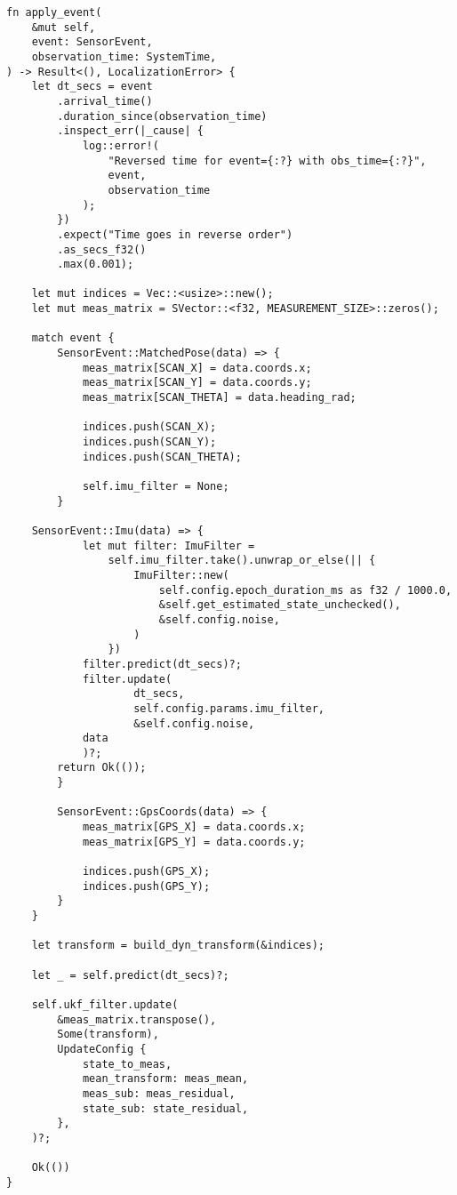 \begin{lstlisting}
fn apply_event(
    &mut self,
    event: SensorEvent,
    observation_time: SystemTime,
) -> Result<(), LocalizationError> {
    let dt_secs = event
        .arrival_time()
        .duration_since(observation_time)
        .inspect_err(|_cause| {
            log::error!(
                "Reversed time for event={:?} with obs_time={:?}",
                event,
                observation_time
            );
        })
        .expect("Time goes in reverse order")
        .as_secs_f32()
        .max(0.001);

    let mut indices = Vec::<usize>::new();
    let mut meas_matrix = SVector::<f32, MEASUREMENT_SIZE>::zeros();

    match event {
        SensorEvent::MatchedPose(data) => {
            meas_matrix[SCAN_X] = data.coords.x;
            meas_matrix[SCAN_Y] = data.coords.y;
            meas_matrix[SCAN_THETA] = data.heading_rad;

            indices.push(SCAN_X);
            indices.push(SCAN_Y);
            indices.push(SCAN_THETA);

            self.imu_filter = None;
        }

	SensorEvent::Imu(data) => {
            let mut filter: ImuFilter =
                self.imu_filter.take().unwrap_or_else(|| {
                    ImuFilter::new(
                        self.config.epoch_duration_ms as f32 / 1000.0,
                        &self.get_estimated_state_unchecked(),
                        &self.config.noise,
                    )
                })
            filter.predict(dt_secs)?;
            filter.update(
                    dt_secs,
                    self.config.params.imu_filter,
                    &self.config.noise,
		    data
            )?;
	    return Ok(());
        }

        SensorEvent::GpsCoords(data) => {
            meas_matrix[GPS_X] = data.coords.x;
            meas_matrix[GPS_Y] = data.coords.y;

            indices.push(GPS_X);
            indices.push(GPS_Y);
        }
    }

    let transform = build_dyn_transform(&indices);

    let _ = self.predict(dt_secs)?;

    self.ukf_filter.update(
        &meas_matrix.transpose(),
        Some(transform),
        UpdateConfig {
            state_to_meas,
            mean_transform: meas_mean,
            meas_sub: meas_residual,
            state_sub: state_residual,
        },
    )?;

    Ok(())
}

\end{lstlisting}


